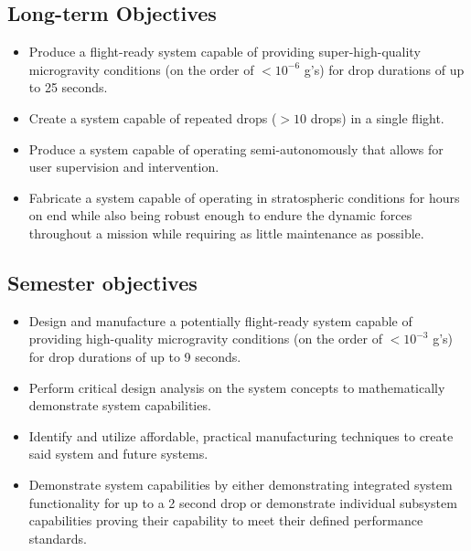 \subsection*{Long-term Objectives}

\begin{itemize}
    \item Produce a flight-ready system capable of providing super-high-quality microgravity conditions (on the order of $< 10^{-6}$ g's) for drop durations of up to 25 seconds.
    \item Create a system capable of repeated drops ($> 10$ drops) in a single flight.
    \item Produce a system capable of operating semi-autonomously that allows for user supervision and intervention. 
    \item Fabricate a system capable of operating in stratospheric conditions for hours on end while also being robust enough to endure the dynamic forces throughout a mission while requiring as little maintenance as possible.
\end{itemize}

\subsection*{Semester objectives}

\begin{itemize}
    \item Design and manufacture a potentially flight-ready system capable of providing high-quality microgravity conditions (on the order of $< 10^{-3}$ g's) for drop durations of up to 9 seconds.
    \item Perform critical design analysis on the system concepts to mathematically demonstrate system capabilities.
    \item Identify and utilize affordable, practical manufacturing techniques to create said system and future systems. 
    \item Demonstrate system capabilities by either demonstrating integrated system functionality for up to a 2 second drop or demonstrate individual subsystem capabilities proving their capability to meet their defined performance standards. 
\end{itemize}




